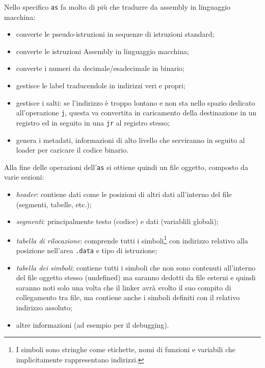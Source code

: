 \documentclass[class=book, crop=false, oneside]{standalone}
\begin{document}
Nello specifico \texttt{as} fa molto di più che tradurre da assembly in linguaggio macchina:
\begin{itemize}
	\item converte le pseudo-istruzioni in sequenze di istruzioni standard;
	\item converte le istruzioni Assembly in linguaggio macchina;
	\item converte i numeri da decimale/esadecimale in binario;
	\item gestisce le label traducendole in indirizzi veri e propri;
	\item gestisce i salti: se l'indirizzo è troppo lontano e non sta nello spazio dedicato all'operazione \texttt{j}, questa va convertita in caricamento della destinazione in un registro ed in seguito in una \texttt{jr} al registro stesso;
	\item genera i metadati, informazioni di alto livello che serviranno in seguito al loader per caricare il codice binario.
\end{itemize}
Alla fine delle operazioni dell'\texttt{as} si ottiene quindi un file oggetto, composto da varie sezioni:
\begin{itemize}
	\item \emph{header}: contiene dati come le posizioni di altri dati all'interno del file (segmenti, tabelle, etc.);
	\item \emph{segmenti}: principalmente testo (codice) e dati (variablili globali);
	\item \emph{tabella di rilocazione}: comprende tutti i simboli\footnote{I simboli sono stringhe come etichette, nomi di funzioni e variabili che implicitamente rappresentano indirizzi.} con indirizzo relativo alla posizione nell'area \texttt{.data} e tipo di istruzione;
	\item \emph{tabella dei simboli}: contiene tutti i simboli che non sono contenuti all'interno del file oggetto stesso (undefined) ma saranno dedotti da file esterni e quindi saranno noti solo una volta che il linker avrà svolto il suo compito di collegamento tra file, ma contiene anche i simboli definiti con il relativo indirizzo assoluto;
	\item altre informazioni (ad esempio per il debugging).
\end{itemize}
\end{document}
